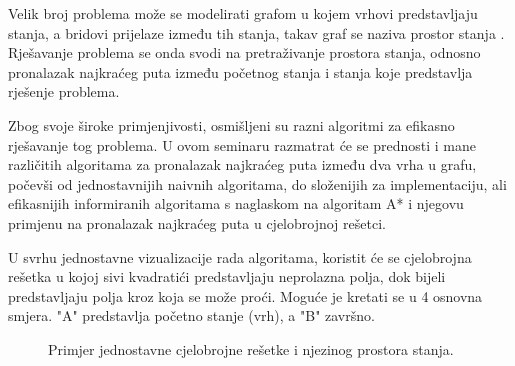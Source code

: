 Velik broj problema može se modelirati grafom u kojem vrhovi predstavljaju stanja, a bridovi prijelaze između tih stanja, takav graf se naziva prostor stanja .
Rješavanje problema se onda svodi na pretraživanje prostora stanja, odnosno pronalazak najkraćeg puta između početnog stanja i stanja koje predstavlja rješenje problema.


Zbog svoje široke primjenjivosti, osmišljeni su razni algoritmi za efikasno rješavanje tog problema. U ovom seminaru razmatrat će se prednosti i mane različitih algoritama za pronalazak najkraćeg puta između dva vrha u grafu, počevši od jednostavnijih naivnih algoritama,  do složenijih za implementaciju, ali efikasnijih informiranih algoritama s naglaskom na algoritam A* i njegovu primjenu na pronalazak najkraćeg puta u cjelobrojnoj rešetci. 

U svrhu jednostavne vizualizacije rada algoritama, koristit će se cjelobrojna rešetka u kojoj sivi kvadratići predstavljaju neprolazna polja, dok bijeli predstavljaju polja kroz koja se može proći. Moguće je kretati se u 4 osnovna smjera. "A" predstavlja početno stanje (vrh), a "B" završno. 

\begin{figure}[h]
	\centering
	
	\caption{Primjer jednostavne cjelobrojne rešetke i njezinog prostora stanja.} 
\end{figure}




